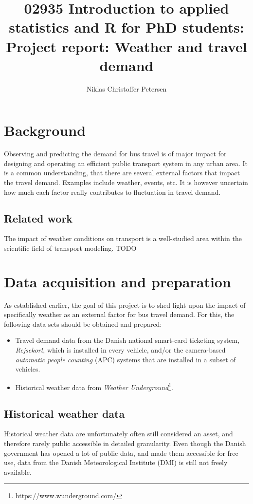 \documentclass[a4paper,11pt]{article}
\title{{\small 02935 Introduction to applied statistics and R for PhD students: }\\[1em]Project report: Weather and travel demand}
\author{Niklas Christoffer Petersen}
\begin{document}
\singlespace
\maketitle

\onehalfspacing

\section{Background}\label{ch:background}


Observing and predicting the demand for bus travel is of major impact for designing and operating an efficient public transport system in any urban area. It is a common understanding, that there are several external factors that impact the travel demand. Examples include weather, events, etc. It is however uncertain how much each factor really contributes to fluctuation in travel demand. 

\subsection{Related work}\label{ch:relatedWork}
The impact of weather conditions on transport is a well-studied area within the scientific field of transport modeling.
TODO
\clearpage

\section{Data acquisition and preparation}\label{ch:data}
As established earlier, the goal of this project is to shed light upon the impact of specifically weather as an external factor for bus travel demand. For this, the following data sets should be obtained and prepared: 
\begin{itemize}
    \item Travel demand data from the Danish national smart-card ticketing system, \emph{Rejsekort}, which is installed in every vehicle, and/or the camera-based \emph{automatic people counting} (APC) systems that are installed in a subset of vehicles. 
    \item Historical weather data from \emph{Weather Underground}\footnote{https://www.wunderground.com/}. %
\end{itemize}

\subsection{Historical weather data}\label{ch:data_weather}
Historical weather data are unfortunately often still considered an asset, and therefore rarely public accessible in detailed granularity. Even though the Danish government has opened a lot of public data, and made them accessible for free use, data from the Danish Meteorological Institute (DMI) is still not freely available.
\end{document}
